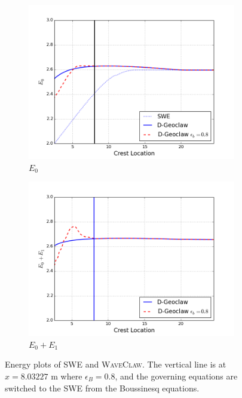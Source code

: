 \documentclass[review]{elsarticle}
\begin{document}
\begin{figure}[!htb]
    \centering
    \begin{subfigure}[b]{0.45\textwidth}
        \includegraphics[width=\textwidth]{_fig/e0_dgeo_eb08.png}
        \caption{$E_0$}
        \label{fig:e0_dgeo_eb08}
    \end{subfigure}
    \begin{subfigure}[b]{0.45\textwidth}
        \includegraphics[width=\textwidth]{_fig/e1_dgeo_eb08.png}
        \caption{$E_0+E_1$}
        \label{fig:e1_dgeo_eb08}
    \end{subfigure}
    \caption{Energy plots of SWE and \textsc{WaveClaw}.
    The vertical line is at $x=8.03227$ m where $\epsilon_B=0.8$,
    and the governing equations are switched to the SWE from
    the Boussinesq equations. }
    \label{fig:energy_dgeo_swe}
\end{figure}
\end{document}
